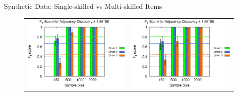 \documentclass[hyperref={pdfpagelabels=false}]{beamer}
\begin{document}
\begin{frame}{Synthetic Data: Single-skilled vs Multi-skilled Items}
	\begin{figure}[ht]
		\begin{center}
			\begin{tabular}{>{\centering}m{1.5in} >{\centering\arraybackslash}m{1.5in}}
				\includegraphics[width=1.1\linewidth]{figures/F1A_single.eps} &\includegraphics[width=1.1\linewidth]{figures/F1A_multi.eps}\\

\end{tabular}
\end{center}
\end{figure}
\end{frame}
\end{document}
